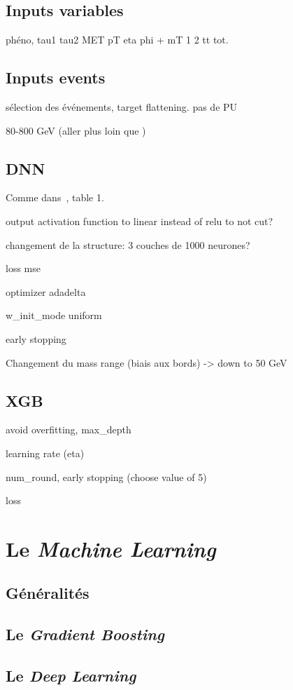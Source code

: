 \subsection*{Inputs variables}
phéno, tau1 tau2 MET pT eta phi + mT 1 2 tt tot.
\subsection*{Inputs events}
sélection des événements, target flattening. pas de PU

80-800 GeV (aller plus loin que \cite{BARTSCHI201929})
\subsection*{DNN}
Comme dans~\cite{BARTSCHI201929}, table 1.

output activation function to linear instead of relu to not cut?

changement de la structure: 3 couches de 1000 neurones?

loss mse

optimizer adadelta

w\_init\_mode uniform

early stopping

Changement du mass range (biais aux bords) -> down to 50 GeV

\subsection*{XGB}
avoid overfitting, max\_depth

learning rate (eta)

num\_round, early stopping (choose value of 5)

loss



\section{Le \emph{Machine Learning}}
\subsection{Généralités}
\subsection{Le \emph{Gradient Boosting}}
\subsection{Le \emph{Deep Learning}}

